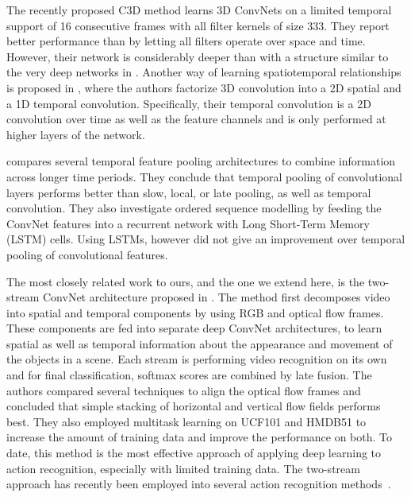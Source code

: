 \documentclass[10pt,twocolumn,letterpaper]{article}
\begin{document}
The recently proposed C3D method \cite{C3DICCV2015} learns 3D ConvNets
on a limited temporal support of 16 consecutive frames with all filter kernels
of size 333.   They report better performance than \cite{Karpathy14} by letting all filters operate over space and time. However, their network is considerably deeper than \cite{JiPAMI13,Karpathy14} with a structure similar to the very deep networks in \cite{simonyan2014very}. Another way of learning spatiotemporal  relationships is proposed in \cite{Sun15}, where the authors factorize 3D convolution into a 2D spatial and a 1D temporal convolution. Specifically, their temporal convolution is a 2D convolution over time as well as the feature channels and is only performed at higher layers of the network.



\cite{ng2015beyond} compares 
several temporal feature pooling architectures to combine information
across longer time periods. They conclude that temporal pooling of
convolutional layers performs better than slow, local, or late
pooling, as well as temporal convolution. They also investigate
ordered sequence modelling by feeding the ConvNet features
into a recurrent network with Long Short-Term Memory (LSTM)
cells. Using LSTMs, however did not give an improvement over temporal
pooling of convolutional features.


The most closely related work to ours, and the one we extend here, 
is the two-stream ConvNet
architecture proposed in \cite{Simonyan14b}. The method first
decomposes video into spatial and temporal components by using RGB and
optical flow frames. These components are fed into separate deep
ConvNet architectures, to learn spatial as well as temporal
information about the appearance and movement of the objects in a
scene.  Each stream is performing video recognition on its own and for
final classification, softmax scores are combined by late fusion. The
authors compared several techniques to align the optical flow frames
and concluded that simple stacking of  horizontal and vertical
flow fields performs best. They also employed multitask learning on
UCF101 and HMDB51 to increase the amount of training data and improve
the performance on both. To date, this method is the most effective
approach of applying deep learning to action recognition, especially
with limited training data. The two-stream approach has recently been employed into several action recognition methods~\cite{Cheron15, donahue2015long,gkioxari2014finding,ng2015beyond,srivastava2015unsupervised,Venugopalan15,Weinzaepfel15}.
\end{document}
